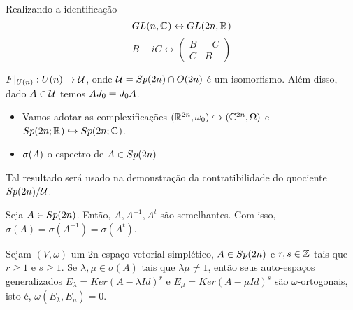 \documentclass{beamer}
\begin{document}
	\begin{frame}
		Realizando a identificação
		$$
		GL(n, \mathbb{C}^{})\leftrightarrow GL(2n, \mathbb{R}^{})
		$$
		$$
		B+iC \leftrightarrow
		\left(
		\begin{array}{cc}
		B & -C
		\\
		C & B
		\end{array}
		\right)
		$$  
		\begin{lema}
			$F|_{U(n)}: U(n) \to \mathcal{U} $, onde $\mathcal{U}  = Sp(2n)\cap O(2n)$ é um isomorfismo. Além disso, dado $A \in \mathcal{U} $ temos $AJ_{0}=J_{0} A$.
		\end{lema}
	\end{frame}
	
	\begin{frame}
		\begin{itemize}
			\item Vamos adotar as complexificações $(\mathbb{R}^{2n}, \omega_{0}) \hookrightarrow (\mathbb{C}^{2n}, \Omega)$ e $Sp(2n;\mathbb{R}^{}) \hookrightarrow Sp(2n; \mathbb{C}^{})$. 
			
			\item $\sigma(A)$ o espectro de $A \in Sp(2n)$ 
		\end{itemize}	
		
		\begin{tiny}
			Tal resultado será usado na demonstração da contratibilidade do quociente $Sp(2n)/\mathcal{U}$.
			
		\end{tiny}
		\begin{lema}
			Seja $A \in Sp(2n)$. Então, $A, A^{-1}, A^{t}$ são semelhantes. Com isso, $\sigma(A) = \sigma(A^{-1}) = \sigma(A^{t}) $.
		\end{lema}
		
		
		\begin{lema}
			Sejam $(V, \omega)$ um 2n-espaço vetorial simplético, $A \in Sp(2n)$ e $r,s \in \mathbb{Z}$ tais que $r\geq 1$ e $s\geq 1$. Se $\lambda, \mu \in \sigma(A)$ tais que $\lambda\mu \neq 1$, então seus auto-espaços generalizados $E_{\lambda}=Ker(A-\lambda Id)^{r}$ e  $E_{\mu}=Ker(A-\mu Id)^{s}$ são $\omega$-ortogonais, isto é, $\omega(E_{\lambda}, E_{\mu}) = 0$.
		\end{lema}
		
	\end{frame}
	
\end{document}
